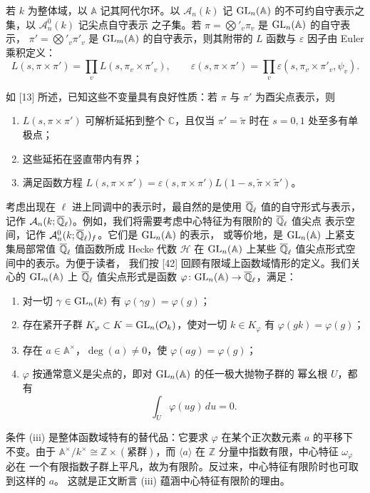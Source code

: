 若 $k$ 为整体域，以 $\mathbb{A}$ 记其阿代尔环。以 $\mathcal{A}_n(k)$ 记
$\mathrm{GL}_n(\mathbb{A})$ 的不可约自守表示之集，以 $\mathcal{A}_n^0(k)$ 记尖点自守表示
之子集。若 $\pi=\bigotimes'_v\pi_v$ 是 $\mathrm{GL}_n(\mathbb{A})$ 的自守表示，
$\pi'=\bigotimes'_v\pi'_v$ 是 $\mathrm{GL}_m(\mathbb{A})$ 的自守表示，则其附带的 $L$ 函数与
$\varepsilon$ 因子由 Euler 乘积定义：
\[
  L(s,\pi\times\pi')=\prod_v L(s,\pi_v\times\pi'_v),\qquad
  \varepsilon(s,\pi\times\pi')=\prod_v\varepsilon(s,\pi_v\times\pi'_v,\psi_v).
\]

如 [13] 所述，已知这些不变量具有良好性质：若 $\pi$ 与 $\pi'$ 为酉尖点表示，则
\begin{enumerate}[label=(\arabic*),leftmargin=*]
  \item $L(s,\pi\times\pi')$ 可解析延拓到整个 $\mathbb{C}$，且仅当
    $\pi'=\tilde\pi$ 时在 $s=0,1$ 处至多有单极点；
  \item 这些延拓在竖直带内有界；
  \item 满足函数方程
    $L(s,\pi\times\pi')=\varepsilon(s,\pi\times\pi')
    L(1-s,\tilde\pi\times\tilde\pi')$。
\end{enumerate}

考虑出现在 $\ell$ 进上同调中的表示时，最自然的是使用 $\overline{\mathbb{Q}}_\ell$ 值的自守形式与表示，
记作 $\mathcal{A}_n(k;\overline{\mathbb{Q}}_\ell)$。例如，我们将需要考虑中心特征为有限阶的 $\overline{\mathbb{Q}}_\ell$ 值尖点
表示空间，记作 $\mathcal{A}_n^0(k;\overline{\mathbb{Q}}_\ell)_f$。它们是 $\mathrm{GL}_n(\mathbb{A})$ 的表示，
或等价地，是 $\mathrm{GL}_n(\mathbb{A})$ 上紧支集局部常值 $\overline{\mathbb{Q}}_\ell$ 值函数所成 Hecke 代数
$\mathcal{H}$ 在 $\mathrm{GL}_n(\mathbb{A})$ 上某些 $\overline{\mathbb{Q}}_\ell$ 值尖点形式空间中的表示。为便于读者，
我们按 [42] 回顾有限域上函数域情形的定义。我们关心的 $\mathrm{GL}_n(\mathbb{A})$ 上
$\overline{\mathbb{Q}}_\ell$ 值尖点形式是函数 $\varphi\colon\mathrm{GL}_n(\mathbb{A})\to\overline{\mathbb{Q}}_\ell$，满足：
\begin{enumerate}[label=(\roman*),leftmargin=*]
  \item 对一切 $\gamma\in\mathrm{GL}_n(k)$ 有 $\varphi(\gamma g)=\varphi(g)$；
  \item 存在紧开子群 $K_\varphi\subset K=\mathrm{GL}_n(\mathcal{O}_k)$，使对一切
    $k\in K_\varphi$ 有 $\varphi(gk)=\varphi(g)$；
  \item 存在 $a\in\mathbb{A}^\times$，$\deg(a)\neq0$，使 $\varphi(ag)=\varphi(g)$；
  \item $\varphi$ 按通常意义是尖点的，即对 $\mathrm{GL}_n(\mathbb{A})$ 的任一极大抛物子群的
    幂幺根 $U$，都有
    \[
      \int_U\varphi(ug)\,du=0.
    \]
\end{enumerate}
\begin{annote}
条件 (iii) 是整体函数域特有的替代品：它要求 $\varphi$ 在某个正次数元素 $a$ 的平移下
不变。由于 $\mathbb{A}^\times/k^\times\cong\mathbb{Z}\times(\text{紧群})$，而
$\langle a\rangle$ 在 $\mathbb{Z}$ 分量中指数有限，中心特征 $\omega_\varphi$ 必在
一个有限指数子群上平凡，故为有限阶。反过来，中心特征有限阶时也可取到这样的 $a$。
这就是正文断言 (iii) 蕴涵中心特征有限阶的理由。
\par{}
\end{annote}


